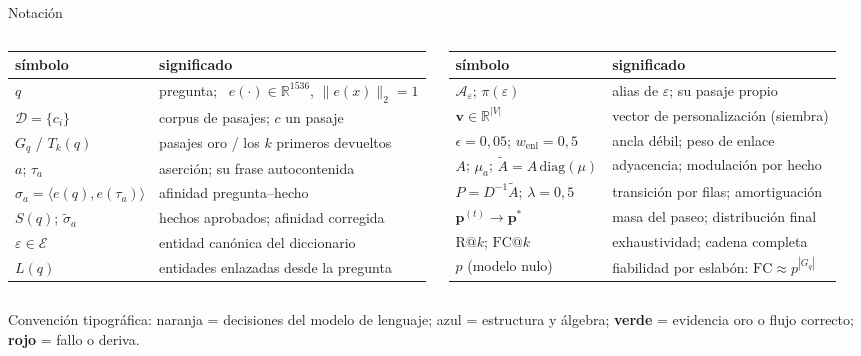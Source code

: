 \documentclass[aspectratio=169,10pt]{beamer}
\newcommand{\bien}[1]{\textcolor{verde}{\textbf{#1}}}
\newcommand{\mal}[1]{\textcolor{teja}{\textbf{#1}}}
\begin{document}
\begin{frame}{Notación}
\centering\footnotesize
\begin{columns}[T]
\begin{tabular}{@{}ll@{}}
\toprule
símbolo & significado\\
\midrule
$q$ & pregunta; \ $e(\cdot)\in\mathbb R^{1536}$, $\lVert e(x)\rVert_2{=}1$ \\
$\mathcal D=\{c_i\}$ & corpus de pasajes; $c$ un pasaje\\
$G_q$ / $T_k(q)$ & pasajes oro / los $k$ primeros devueltos\\
$a$; $\tau_a$ & aserción; su frase autocontenida\\
$\sigma_a=\langle e(q),e(\tau_a)\rangle$ & afinidad pregunta--hecho\\
$S(q)$; $\tilde\sigma_a$ & hechos aprobados; afinidad corregida\\
$\varepsilon\in\mathcal E$ & entidad canónica del diccionario\\
$L(q)$ & entidades enlazadas desde la pregunta\\
\bottomrule
\end{tabular}
\begin{tabular}{@{}ll@{}}
\toprule
símbolo & significado\\
\midrule
$\mathcal A_\varepsilon$; $\pi(\varepsilon)$ & alias de $\varepsilon$; su pasaje propio\\
$\mathbf v\in\mathbb R^{|V|}$ & vector de personalización (siembra)\\
$\epsilon=0{,}05$; $w_{\text{enl}}{=}0{,}5$ & ancla débil; peso de enlace\\
$A$; $\mu_a$; $\tilde A=A\,\mathrm{diag}(\mu)$ & adyacencia; modulación por hecho\\
$P=D^{-1}\tilde A$; $\lambda=0{,}5$ & transición por filas; amortiguación\\
$\mathbf p^{(t)}\!\to\mathbf p^{*}$ & masa del paseo; distribución final\\
$\mathrm{R@}k$; $\mathrm{FC@}k$ & exhaustividad; cadena completa\\
$p$ (modelo nulo) & fiabilidad por eslabón: $\mathrm{FC}\!\approx\!p^{|G_q|}$\\
\bottomrule
\end{tabular}
\end{columns}
\vspace{2mm}
\scriptsize Convención tipográfica: \textcolor{teja}{naranja} = decisiones del
modelo de lenguaje; \textcolor{azul}{azul} = estructura y álgebra;
\bien{verde} = evidencia oro o flujo correcto; \mal{rojo} = fallo o deriva.
\end{frame}
\end{document}
